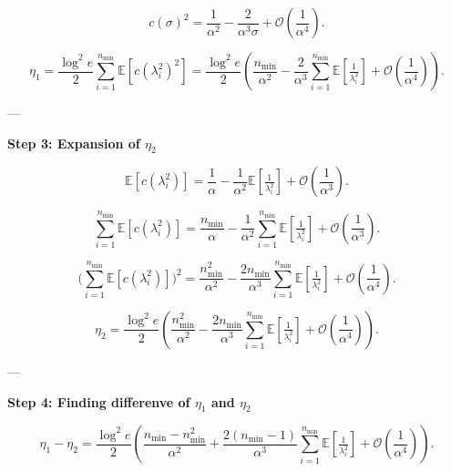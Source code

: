 \documentclass[a4paper, 12pt, onecolumn, journal, twoside, draftclsnofoot]{IEEEtran}
\begin{document}
\begin{equation*}
c(\sigma)^2 = \frac{1}{\alpha^2} - \frac{2}{\alpha^3\sigma} 
+ \mathcal{O}\!\left(\frac{1}{\alpha^4}\right).
\end{equation*}

\begin{equation*}
\eta_1 = \frac{\log^2 e}{2}\sum_{i=1}^{n_{\min}}
\mathbb{E}[c(\lambda_i^2)^2]
= \frac{\log^2 e}{2}\left(
\frac{n_{\min}}{\alpha^2} 
- \frac{2}{\alpha^3}\sum_{i=1}^{n_{\min}}\mathbb{E}\!\left[\tfrac{1}{\lambda_i^2}\right]
+ \mathcal{O}\!\left(\frac{1}{\alpha^4}\right)\right).
\end{equation*}

---

\textbf{Step 3: Expansion of $\eta_2$}

\begin{equation*}
\mathbb{E}[c(\lambda_i^2)] = \frac{1}{\alpha} 
- \frac{1}{\alpha^2}\mathbb{E}\!\left[\tfrac{1}{\lambda_i^2}\right]
+ \mathcal{O}\!\left(\frac{1}{\alpha^3}\right).
\end{equation*}

\begin{equation*}
\sum_{i=1}^{n_{\min}}\mathbb{E}[c(\lambda_i^2)]
= \frac{n_{\min}}{\alpha} 
- \frac{1}{\alpha^2}\sum_{i=1}^{n_{\min}}\mathbb{E}\!\left[\tfrac{1}{\lambda_i^2}\right]
+ \mathcal{O}\!\left(\frac{1}{\alpha^3}\right).
\end{equation*}

\begin{equation*}
\Bigg(\sum_{i=1}^{n_{\min}}\mathbb{E}[c(\lambda_i^2)]\Bigg)^2
= \frac{n_{\min}^2}{\alpha^2} 
- \frac{2n_{\min}}{\alpha^3}\sum_{i=1}^{n_{\min}}\mathbb{E}\!\left[\tfrac{1}{\lambda_i^2}\right]
+ \mathcal{O}\!\left(\frac{1}{\alpha^4}\right).
\end{equation*}

\begin{equation*}
\eta_2 = \frac{\log^2 e}{2}\left(
\frac{n_{\min}^2}{\alpha^2} 
- \frac{2n_{\min}}{\alpha^3}\sum_{i=1}^{n_{\min}}\mathbb{E}\!\left[\tfrac{1}{\lambda_i^2}\right]
+ \mathcal{O}\!\left(\frac{1}{\alpha^4}\right)\right).
\end{equation*}

---

\textbf{Step 4: Finding differenve of $\eta_1$ and $\eta_2$ }

\begin{equation*}
\eta_1 - \eta_2 = \frac{\log^2 e}{2}\left(
\frac{n_{\min}-n_{\min}^2}{\alpha^2}
+ \frac{2(n_{\min}-1)}{\alpha^3}\sum_{i=1}^{n_{\min}}\mathbb{E}\!\left[\tfrac{1}{\lambda_i^2}\right]
+ \mathcal{O}\!\left(\frac{1}{\alpha^4}\right)\right).
\end{equation*}
\end{document}
